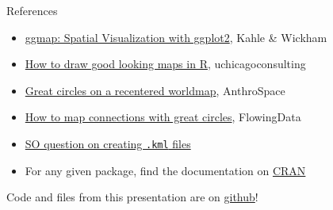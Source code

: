 \documentclass[sans,aspectratio=169,presentation,bigger,fleqn]{beamer}
\begin{document}
\begin{frame}[fragile,label=sec-36]{References}
 \begin{itemize}
\item \href{http://stat405.had.co.nz/ggmap.pdf}{ggmap: Spatial Visualization with ggplot2}, Kahle \& Wickham
\item \href{http://uchicagoconsulting.wordpress.com/2011/04/18/how-to-draw-good-looking-maps-in-r/}{How to draw good looking maps in R}, uchicagoconsulting
\item \href{http://www.stanford.edu/~cengel/cgi-bin/anthrospace/great-circles-on-a-recentered-worldmap-in-ggplot}{Great circles on a recentered worldmap}, AnthroSpace
\item \href{http://flowingdata.com/2011/05/11/how-to-map-connections-with-great-circles/}{How to map connections with great circles}, FlowingData
\item \href{http://stackoverflow.com/questions/21487010/assistance-with-name-and-styleurl-in-kml-when-using-writeogr-from-rgdal}{SO question on creating \texttt{.kml} files}
\item For any given package, find the documentation on \href{http://cran.r-project.org/}{CRAN}
\end{itemize}

\vspace{0.5cm}

Code and files from this presentation are on \href{https://github.com/jwhendy/devFest-geo}{github}!
\end{frame}
\end{document}
